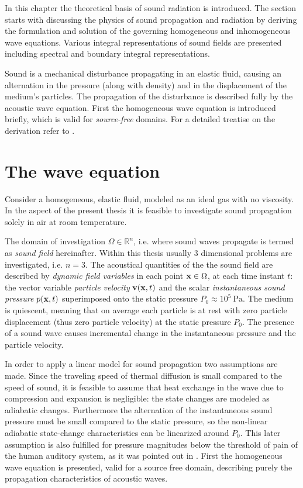 In this chapter the theoretical basis of sound radiation is introduced. 
The section starts with discussing the physics of sound propagation and radiation by deriving the formulation and solution of the governing homogeneous and inhomogeneous wave equations. 
Various integral representations of sound fields are presented including spectral and boundary integral representations.
%

\vspace{3mm}
Sound is a mechanical disturbance propagating in an elastic fluid, causing an alternation in the pressure (along with density) and in the displacement of the medium's particles.
The propagation of the disturbance is described fully by the acoustic wave equation. 
First the homogeneous wave equation is introduced briefly, which is valid for \emph{source-free} domains. 
For a detailed treatise on the derivation refer to \cite{Beranek1993, Morse1968, Williams1999, Blackstock2000}.

%
\section{The wave equation}

Consider a homogeneous, elastic fluid, modeled as an ideal gas with no viscosity. 
In the aspect of the present thesis it is feasible to investigate sound propagation solely in air at room temperature.

%
The domain of investigation $\Omega \in \mathbb{R}^n$, i.e. where sound waves propagate is termed as \emph{sound field} hereinafter.
Within this thesis usually 3 dimensional problems are investigated, i.e. $n = 3$.
The acoustical quantities of the the sound field are described by \emph{dynamic field variables} in each point $\mathbf{x} \in \Omega$, at each time instant $t$: the vector variable \emph{particle velocity} $\mathbf{v}(\mathbf{x},t)$ and the scalar \emph{instantaneous sound pressure} $p(\mathbf{x},t)$ superimposed onto the static pressure $P_0 \approx 10^5~\mathrm{Pa}$.
The medium is quiescent, meaning that on average each particle is at rest with zero particle displacement (thus zero particle velocity) at the static pressure $P_0$. 
The presence of a sound wave causes incremental change in the instantaneous pressure and the particle velocity.
%

In order to apply a linear model for sound propagation two assumptions are made.
Since the traveling speed of thermal diffusion is small compared to the speed of sound, it is feasible to assume that heat exchange in the wave due to compression and expansion is negligible: the state changes are modeled as adiabatic changes.
Furthermore the alternation of the instantaneous sound pressure must be small compared to the static pressure, so the non-linear adiabatic state-change characteristics can be linearized around $P_0$.
This later assumption is also fulfilled for pressure magnitudes below the threshold of pain of the human auditory system, as it was pointed out in \cite{Gumerov2004, Ahrens2012}.
First the homogeneous wave equation is presented, valid for a source free domain, describing purely the propagation characteristics of acoustic waves.
%

